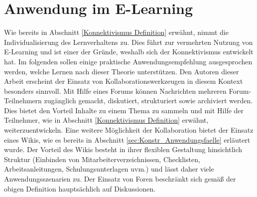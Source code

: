 \section{Anwendung im E-Learning}
Wie bereits in Abschnitt \ref{Konnektivismus Definition} erwähnt, nimmt die Individualisierung des Lernverhaltens zu. Dies führt zur vermehrten Nutzung von E-Learning und ist einer der Gründe, weshalb sich der Konnektivismus entwickelt hat.\cite[S. 47f.]{Kuhlmann.2008} Im folgenden sollen einige praktische Anwendungsempfehlung ausgesprochen werden, welche Lernen nach dieser Theorie unterstützen. Den Autoren dieser Arbeit erscheint der Einsatz von Kollaborationswerkzeugen in diesem Kontext besonders sinnvoll. 
Mit Hilfe eines Forums können Nachrichten mehreren Forum-Teilnehmern zugänglich gemacht, diskutiert, strukturiert sowie archiviert werden. Dies bietet den Vorteil Inhalte zu einem Thema zu sammeln und mit Hilfe der Teilnehmer, wie in Abschnitt \ref{Konnektivismus Definition} erwähnt, weiterzuentwickeln.\cite[S. 67f.]{Drummer.2011} Eine weitere Möglichkeit der Kollaboration bietet der Einsatz eines Wikis, wie es bereits in Abschnitt \ref{sec:Konstr_Anwendungsfaelle} erläutert wurde. Der Vorteil des Wikis besteht in ihrer flexiblen Gestaltung hinsichtlich Struktur (Einbinden von Mitarbeiterverzeichnissen, Checklisten, Arbeitsanleitungen, Schulungsunterlagen uvm.) und lässt daher viele Anwendungsszenarien zu.\cite[S. 77]{Mertins.2009} Der Einsatz von Foren beschränkt sich gemäß der obigen Definition hauptsächlich auf Diskussionen.



